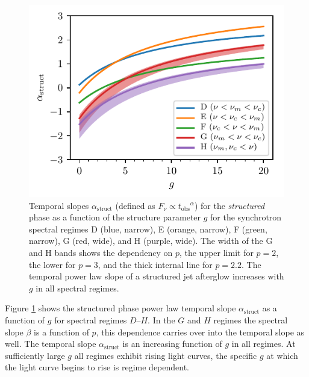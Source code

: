 \documentclass[twocolumn]{aastex62}
\newcommand{\tobs}{\ensuremath{t_{\mathrm{obs}}}}
\begin{document}
\begin{figure}
	\includegraphics[width=\columnwidth]{figs/slopesStruct.pdf}
	\caption{Temporal slopes $\alpha_{\mathrm{struct}}$ (defined as $F_\nu \propto \tobs^{\alpha}$) for the \emph{structured} phase as a function of the structure parameter $g$ for the synchrotron spectral regimes D (blue, narrow), E (orange, narrow),  F (green, narrow), G (red, wide), and H (purple, wide).  The width of the G and H bands shows the dependency on $p$, the upper limit for $p=2$, the lower for $p=3$, and the thick internal line for $p=2.2$. The temporal power law slope of a structured jet afterglow increases with $g$ in all spectral regimes. \label{fig:slopesG}}
\end{figure}

Figure \ref{fig:slopesG} shows the structured phase power law temporal slope $\alpha_{\mathrm{struct}}$ as a function of $g$ for spectral regimes $D$--$H$. In the $G$ and $H$ regimes the spectral slope $\beta$ is a function of $p$, this dependence carries over into the temporal slope as well. The temporal slope $\alpha_{\mathrm{struct}}$ is an increasing function of $g$ in all regimes.  At sufficiently large $g$ all regimes exhibit rising light curves, the specific $g$ at which the light curve begins to rise is regime dependent.
\end{document}
